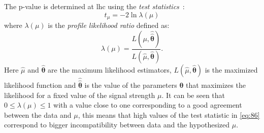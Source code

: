 The p-value is determined at \gls{lhc} using the \emph{test
  statistics}~\cite{StatProcedure}:
\begin{equation}
  \label{eq:86}
  t_\mu = - 2 \ln \lambda(\mu)
\end{equation}
where $\lambda(\mu)$ is the \emph{profile likelihood ratio} defined as:
\begin{equation}
  \label{eq:87}
  \lambda(\mu) = \frac{L(\mu, \hat{\hat{\boldsymbol{\theta}}})}{L(\hat{\mu},
    \hat{\boldsymbol{\theta}})}.
\end{equation}
Here $\hat{\mu}$ and $\hat{\boldsymbol{\theta}}$ are the maximum likelihood
estimators, $L(\hat{\mu}, \hat{\boldsymbol{\theta}})$ is the maximized likelihood
function and $\hat{\hat{\boldsymbol{\theta}}}$ is the value of the parameters
$\boldsymbol{\theta}$ that maximizes the likelihood for a fixed value of the
signal strength $\mu$. It can be seen that $0 \leq \lambda(\mu) \leq 1$ with a
value close to one corresponding to a good agreement between the data and $\mu$,
this means that high values of the test statistic in \cref{eq:86} correspond to
bigger incompatibility between data and the hypothesized $\mu$.


